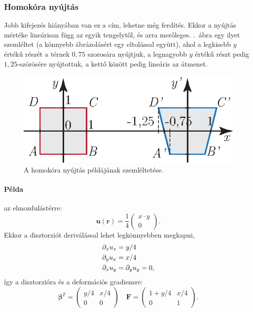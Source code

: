 \documentclass[12pt,a4paper]{scrartcl}
\let\mathbf\bm
\begin{document}
\subsubsection{Homokóra nyújtás}
Jobb kifejezés hiányában van ez a cím, lehetne még ferdítés. Ekkor a nyújtás mértéke lineárisan függ az egyik tengelytől, és arra merőleges. .\ ábra egy ilyet szemléltet (a könnyebb ábrázolásért egy eltolással együtt), ahol a legkisebb $y$ értékű részét a térnek $0{,}75$ szorosára nyújtjuk, a legnagyobb $y$ értékű részt pedig $1{,}25$-szörösére nyújtottuk, a kettő között pedig lineáris az átmenet.
\begin{figure}[htb] 
\centering    
\includegraphics[scale=1]{figs/homokora_nyujtas_szamolos.eps}
\caption{A homokóra nyújtás példájának szemléltetése.}
\label{fig:homokora_nyujtas_szamolos}
\end{figure}

\footnotesize
\paragraph{Példa} az elmozdulástérre:
\[{\mathbf{u}}\left( {\mathbf{r}} \right) = \frac{1}{4}\left( {\begin{array}{*{20}{c}}
  {x \cdot y} \\ 
  0 
\end{array}} \right).\]
Ekkor a disztorziót deriválással lehet legkönnyebben megkapni,
\[\begin{gathered}
  {\partial _x}{u_x} = y/4 \hfill \\
  {\partial _y}{u_x} = x/4 \hfill \\
  {\partial _x}{u_y} = {\partial _y}{u_y} = 0, \hfill \\ 
\end{gathered} \]
így a disztorzióra és a deformációs gradiensre:
\[{{\mathbf{\beta }}^T} = \left( {\begin{array}{*{20}{c}}
  {y/4}&{x/4} \\ 
  0&0 
\end{array}} \right)\quad {\mathbf{F}} = \left( {\begin{array}{*{20}{c}}
  {1 + y/4}&{x/4} \\ 
  0&1 
\end{array}} \right).\]
\end{document}
